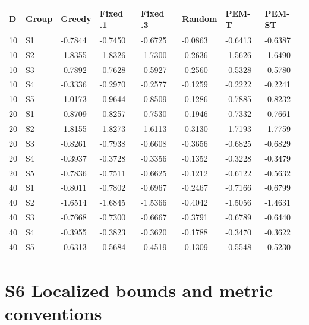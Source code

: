 \documentclass[11pt,a4paper]{article}
\begin{document}
\par\noindent\begin{minipage}{\linewidth}

\begin{longtable}[]{@{}llllllll@{}}
\toprule
D & Group & Greedy & Fixed .1 & Fixed .3 & Random & PEM-T & PEM-ST \\
\midrule
\endhead
10 & S1 & -0.7844 & -0.7450 & -0.6725 & -0.0863 & -0.6413 & -0.6387 \\
10 & S2 & -1.8355 & -1.8326 & -1.7300 & -0.2636 & -1.5626 & -1.6490 \\
10 & S3 & -0.7892 & -0.7628 & -0.5927 & -0.2560 & -0.5328 & -0.5780 \\
10 & S4 & -0.3336 & -0.2970 & -0.2577 & -0.1259 & -0.2222 & -0.2241 \\
10 & S5 & -1.0173 & -0.9644 & -0.8509 & -0.1286 & -0.7885 & -0.8232 \\
20 & S1 & -0.8709 & -0.8257 & -0.7530 & -0.1946 & -0.7332 & -0.7661 \\
20 & S2 & -1.8155 & -1.8273 & -1.6113 & -0.3130 & -1.7193 & -1.7759 \\
20 & S3 & -0.8261 & -0.7938 & -0.6608 & -0.3656 & -0.6825 & -0.6829 \\
20 & S4 & -0.3937 & -0.3728 & -0.3356 & -0.1352 & -0.3228 & -0.3479 \\
20 & S5 & -0.7836 & -0.7511 & -0.6625 & -0.1212 & -0.6122 & -0.5632 \\
40 & S1 & -0.8011 & -0.7802 & -0.6967 & -0.2467 & -0.7166 & -0.6799 \\
40 & S2 & -1.6514 & -1.6845 & -1.5366 & -0.4042 & -1.5056 & -1.4631 \\
40 & S3 & -0.7668 & -0.7300 & -0.6667 & -0.3791 & -0.6789 & -0.6440 \\
40 & S4 & -0.3955 & -0.3823 & -0.3620 & -0.1788 & -0.3470 & -0.3622 \\
40 & S5 & -0.6313 & -0.5684 & -0.4519 & -0.1309 & -0.5548 & -0.5230 \\
\bottomrule
\end{longtable}

\end{minipage}\par

\newpage

\hypertarget{s6-localized-bounds-and-metric-conventions}{%
\section{S6 Localized bounds and metric
conventions}\label{s6-localized-bounds-and-metric-conventions}}
\end{document}
